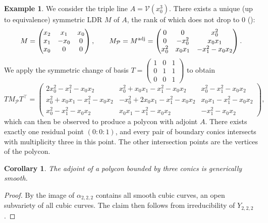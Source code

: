 \documentclass[a4paper,10pt]{amsart}
\theoremstyle{definition}
\newtheorem{ex}[defin]{Example}
\theoremstyle{plain}
\newtheorem{cor}[defin]{Corollary}
\newcommand{\cP}{{\mathcal P}}
\begin{document}
\begin{ex}
 We consider the triple line $A = \mathcal{V}(x_0^3)$. There exists a unique (up to equivalence) symmetric LDR $M$ of $A$, the rank of which does not drop to $0$ (\cite[Table 7]{Piontkowski2006singLDR}):
 \begin{equation*}
     M = \begin{pmatrix}
         x_2 & x_1 & x_0 \\
         x_1 & -x_0 & 0 \\
         x_0 & 0 & 0
     \end{pmatrix}, \qquad M_\cP = M^{\textup{adj}} = \begin{pmatrix}
         0 & 0 & x_0^2 \\
         0 & -x_0^2 & x_0x_1 \\
         x_0^2& x_0x_1 & -x_1^2-x_0x_2
     \end{pmatrix}.
 \end{equation*}
 We apply the symmetric change of basis $T = \begin{pmatrix}
         1&0&1\\
         0&1&1\\
         0&0&1
     \end{pmatrix}$ to obtain
 \begin{equation*}
     T M_\cP T^\top = \begin{pmatrix}
         2x_0^2-x_1^2-x_0x_2 & x_0^2+x_0x_1-x_1^2-x_0x_2 & x_0^2-x_1^2-x_0x_2 \\
         x_0^2+x_0x_1-x_1^2-x_0x_2 & -x_0^2+2x_0x_1-x_1^2-x_0x_2 & x_0x_1-x_1^2-x_0x_2 \\
         x_0^2-x_1^2-x_0x_2 & x_0x_1-x_1^2-x_0x_2 & -x_1^2-x_0x_2
     \end{pmatrix},
 \end{equation*}
 which can then be observed to produce a polycon with adjoint $A$. There exists exactly one residual point $(0:0:1)$, and every pair of boundary conics intersects with multiplicity three in this point. The other intersection points are the vertices of the polycon.
\end{ex}


\begin{cor}
 The adjoint of a polycon bounded by three conics is generically smooth.
\end{cor}

\begin{proof}
By  the image of $\alpha_{2,2,2}$ contains all smooth cubic curves, an open subvariety of all cubic curves. The claim then follows from irreducibility of $Y_{2,2,2}$.
\end{proof}
\end{document}
